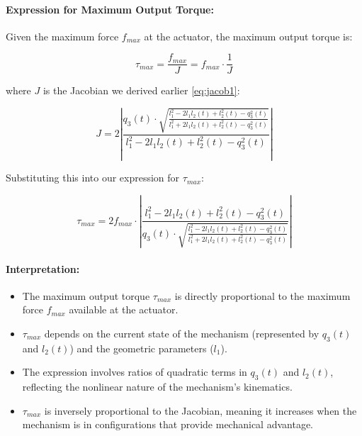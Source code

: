 \begin{solution}
\paragraph{Expression for Maximum Output Torque:}
Given the maximum force $f_{max}$ at the actuator, the maximum output torque is:

\begin{equation}
    \tau_{max} = \frac{f_{max}}{J} = f_{max} \cdot \frac{1}{J}
\end{equation}

where $J$ is the Jacobian we derived earlier \eqref{eq:jacob1}:

\begin{equation}
    J = 2\left|\frac{q_3(t)\cdot \sqrt{\frac{l_1^2 - 2l_1l_2(t) + l_2^2(t) - q_3^2(t)}{l_1^2 + 2l_1l_2(t) + l_2^2(t) - q_3^2(t)}}}{ {l_1^2 - 2l_1l_2(t) + l_2^2(t) - q_3^2(t)}} \right|
\end{equation}

Substituting this into our expression for $\tau_{max}$:

\begin{equation}
    \tau_{max} = 2f_{max}\cdot\left|\frac{ {l_1^2 - 2l_1l_2(t) + l_2^2(t) - q_3^2(t)}}{q_3(t)\cdot \sqrt{\frac{l_1^2 - 2l_1l_2(t) + l_2^2(t) - q_3^2(t)}{l_1^2 + 2l_1l_2(t) + l_2^2(t) - q_3^2(t)}}} \right|
\end{equation}

\paragraph{Interpretation:}
\begin{itemize}
    \item The maximum output torque $\tau_{max}$ is directly proportional to the maximum force $f_{max}$ available at the actuator.
    \item $\tau_{max}$ depends on the current state of the mechanism (represented by $q_3(t)$ and $l_2(t)$) and the geometric parameters ($l_1$).
    \item The expression involves ratios of quadratic terms in $q_3(t)$ and $l_2(t)$, reflecting the nonlinear nature of the mechanism's kinematics.
    \item $\tau_{max}$ is inversely proportional to the Jacobian, meaning it increases when the mechanism is in configurations that provide mechanical advantage.
\end{itemize}


\end{solution}
